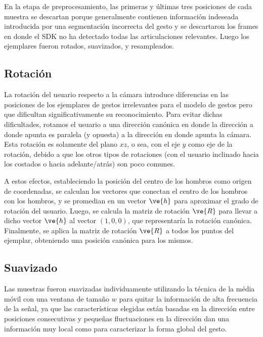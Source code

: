 

En la etapa de preprocesamiento, las primeras y últimas tres posiciones de cada muestra se descartan porque generalmente contienen información indeseada introducida por una segmentación incorrecta del gesto y se descartaron los frames en donde el SDK no ha detectado todas las articulaciones relevantes. Luego los ejemplares fueron rotados, suavizados, y resampleados.

\subsection{Rotación}

La rotación del usuario respecto a la cámara introduce diferencias en las posiciones de los ejemplares de gestos irrelevantes para el modelo de gestos pero que dificultan significativamente su reconocimiento. Para evitar dichas dificultades, rotamos el usuario a una dirección canónica en donde la dirección a donde apunta es paralela (y opuesta) a la dirección en donde apunta la cámara. Esta rotación es solamente del plano $xz$, o sea, con el eje $y$ como eje de la rotación, debido a que los otros tipos de rotaciones (con el usuario inclinado hacia los costados o hacia adelante/atrás) son poco comunes.


A estos efectos, estableciendo la posición del centro de los hombros como origen de coordenadas, se calculan los vectores que conectan el centro de los hombros con los hombros, y se promedian en un vector $\ve{h}$ para aproximar el grado de rotación del usuario. Luego, se calcula la matriz de rotación $\ve{R}$ para llevar a dicho vector $\ve{h}$ al vector $(1,0,0)$, que representaría la rotación canónica. Finalmente, se aplica la matriz de rotación $\ve{R}$ a todos los puntos del ejemplar, obteniendo una posición canónica para los mismos.

\subsection{Suavizado}
Las muestras fueron suavizadas individuamente utilizando la técnica de la média móvil con una ventana de tamaño $w$ para quitar la información de alta frecuencia de la señal, ya que las características elegidas están basadas en la dirección entre posiciones consecutivas y pequeñas fluctuaciones en la dirección dan una información muy local como para caracterizar la forma global del gesto.

